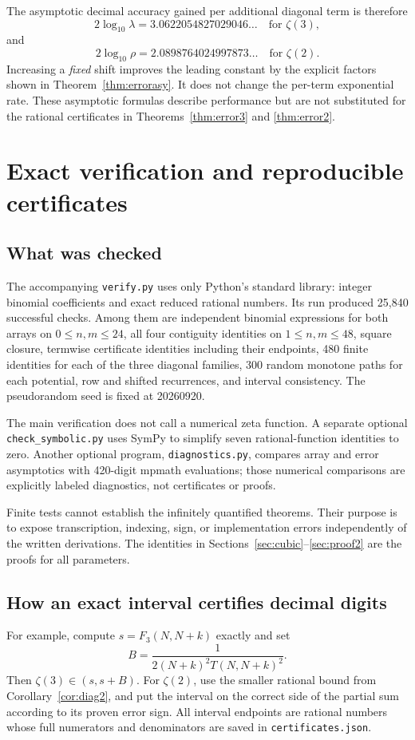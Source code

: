 \documentclass[11pt]{article}
\numberwithin{equation}{section}
\theoremstyle{definition}
\theoremstyle{remark}
\begin{document}
The asymptotic decimal accuracy gained per additional diagonal term is
therefore
\[
 2\log_{10}\lambda=3.0622054827029046\ldots
 \quad\text{for }\zeta(3),
\]
and
\[
 2\log_{10}\rho=2.0898764024997873\ldots
 \quad\text{for }\zeta(2).
\]
Increasing a \emph{fixed} shift improves the leading constant by the
explicit factors shown in Theorem~\ref{thm:errorasy}. It does not change
the per-term exponential rate. These asymptotic formulas describe
performance but are not substituted for the rational certificates in
Theorems~\ref{thm:error3} and \ref{thm:error2}.

\section{Exact verification and reproducible certificates}\label{sec:computation}

\subsection{What was checked}
The accompanying \texttt{verify.py} uses only Python's standard library:
integer binomial coefficients and exact reduced rational numbers.
Its run produced 25,840 successful checks. Among them are independent
binomial expressions for both arrays on $0\leq n,m\leq24$, all four
contiguity identities on $1\leq n,m\leq48$, square closure, termwise
certificate identities including their endpoints, 480 finite identities
for each of the three diagonal families, 300 random monotone paths for
each potential, row and shifted recurrences, and interval consistency.
The pseudorandom seed is fixed at 20260920.

The main verification does not call a numerical zeta function.
A separate optional \texttt{check\_symbolic.py} uses SymPy to simplify
seven rational-function identities to zero. Another optional program,
\texttt{diagnostics.py}, compares array and error asymptotics with
420-digit mpmath evaluations; those numerical comparisons are explicitly
labeled diagnostics, not certificates or proofs.

Finite tests cannot establish the infinitely quantified theorems.
Their purpose is to expose transcription, indexing, sign, or
implementation errors independently of the written derivations.
The identities in Sections~\ref{sec:cubic}--\ref{sec:proof2} are the
proofs for all parameters.

\subsection{How an exact interval certifies decimal digits}
For example, compute $s=F_3(N,N+k)$ exactly and set
\[
 B=\frac1{2(N+k)^2T(N,N+k)^2}.
\]
Then $\zeta(3)\in(s,s+B)$. For $\zeta(2)$, use the smaller rational
bound from Corollary~\ref{cor:diag2}, and put the interval on the correct
side of the partial sum according to its proven error sign.
All interval endpoints are rational numbers whose full numerators and
denominators are saved in \texttt{certificates.json}.
\end{document}
